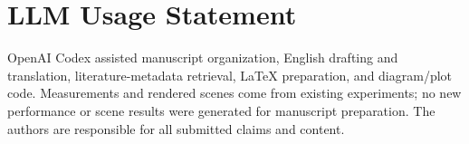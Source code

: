 \section*{LLM Usage Statement}
OpenAI Codex assisted manuscript organization, English drafting and translation, literature-metadata retrieval, LaTeX preparation, and diagram/plot code. Measurements and rendered scenes come from existing experiments; no new performance or scene results were generated for manuscript preparation. The authors are responsible for all submitted claims and content.
